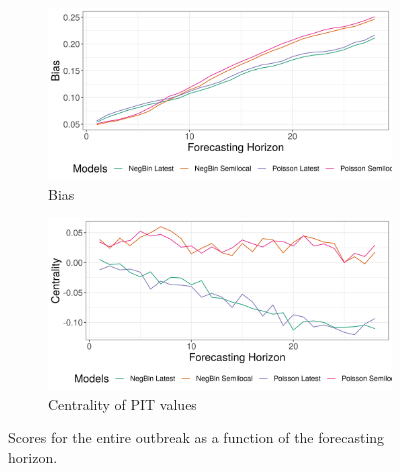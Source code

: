 \begin{figure}[H]
\begin{subfigure}{0.5\textwidth}
  \centering
  \includegraphics[width=\linewidth]{../output/Masereka_bias.png}  
  \caption{Bias}
  \label{fig:sub-third}
\end{subfigure}
\begin{subfigure}{0.5\textwidth}
  \centering
  \includegraphics[width=\linewidth]{../output/Masereka_centrality.png}  
  \caption{Centrality of PIT values}
  \label{fig:nat_scores_4}
\end{subfigure}
  \caption{Scores for the entire outbreak as a function of the forecasting horizon.}

  \label{fig:nat_scores}
\end{figure}
